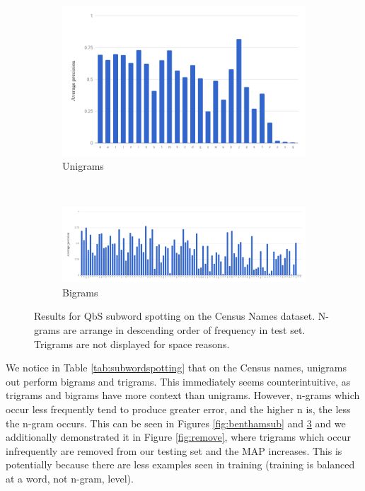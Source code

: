 \documentclass[ms,electronic,twosidetoc,letterpaper,chaptercenter,parttop,lol,lof,lot]{byumsphd}
\begin{document}
\begin{figure}
\centering
\begin{subfigure}{.99\textwidth}
  \centering
  \includegraphics[width=.75\linewidth]{namesUniSpot}
  \caption{Unigrams}
  \label{fig:namesUniSpot}
\end{subfigure}
\\
\begin{subfigure}{.99\textwidth}
  \centering
  \includegraphics[width=.99\linewidth]{namesBiSpot}
  \caption{Bigrams}
  \label{fig:namesBiSpot}
\end{subfigure}
\caption{Results for QbS subword spotting on the Census Names dataset. N-grams are arrange in descending order of frequency in test set. Trigrams are not displayed for space reasons.}
\label{fig:namessub}
\end{figure}

We notice in Table \ref{tab:subwordspotting} that on the Census names, unigrams out perform bigrams and trigrams. This immediately seems counterintuitive, as trigrams and bigrams have more context than unigrams. However, n-grams which occur less frequently tend to produce greater error, and the higher n is, the less the n-gram occurs. 
This can be seen in Figures \ref{fig:benthamsub} and \ref{fig:namessub} and we additionally demonstrated it in Figure \ref{fig:remove}, where trigrams which occur infrequently are removed from our testing set and the MAP increases. This is potentially because there are less examples seen in training (training is balanced at a word, not n-gram, level).
\end{document}
